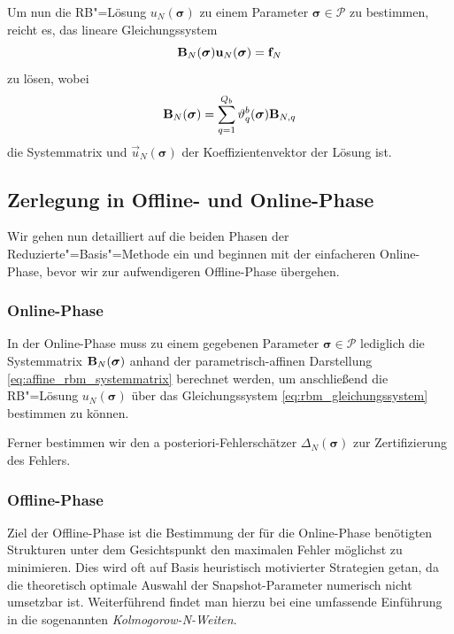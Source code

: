 \documentclass[../main.tex]{subfiles}
\begin{document}
Um nun die RB"=Lösung $u_{N}(\bm \sigma)$ zu einem Parameter $\bm \sigma \in \mathcal P$ zu bestimmen, reicht es, das lineare Gleichungssystem
\begin{equation}
\label{eq:rbm_gleichungssystem}
    \mathbf{B}_{N}(\bm \sigma) \mathbf{u}_{N}(\bm \sigma) = \mathbf{f}_{N}
\end{equation}
zu lösen, wobei
\begin{equation}
\label{eq:affine_rbm_systemmatrix}
    \mathbf{B}_{N}(\bm \sigma) = \sum_{q = 1}^{Q_b} \vartheta_{q}^{b}(\bm \sigma) \mathbf{B}_{N, q}
\end{equation}
die Systemmatrix und $\vec{u}_{N}(\bm \sigma)$ der Koeffizientenvektor der Lösung ist.

\subsection{Zerlegung in Offline- und Online-Phase} %
\label{sub:zerlegung_in_offline_und_online_phase}

Wir gehen nun detailliert auf die beiden Phasen der Reduzierte"=Basis"=Methode ein und beginnen mit der einfacheren Online-Phase, bevor wir zur aufwendigeren Offline-Phase übergehen.

\subsubsection{Online-Phase} %
\label{ssub:online_phase}

In der Online-Phase muss zu einem gegebenen Parameter $\bm \sigma \in \mathcal P$ lediglich die Systemmatrix $\mathbf{B}_{N}(\bm \sigma)$ anhand der parametrisch-affinen Darstellung \cref{eq:affine_rbm_systemmatrix} berechnet werden, um anschließend die RB"=Lösung $u_{N}(\bm \sigma)$ über das Gleichungssystem \cref{eq:rbm_gleichungssystem} bestimmen zu können.

Ferner bestimmen wir den a posteriori-Fehlerschätzer $\Delta_{N}(\bm \sigma)$ zur Zertifizierung des Fehlers.


\subsubsection{Offline-Phase} %
\label{ssub:offline_phase}

Ziel der Offline-Phase ist die Bestimmung der für die Online-Phase benötigten Strukturen unter dem Gesichtspunkt den maximalen Fehler möglichst zu minimieren.
Dies wird oft auf Basis heuristisch motivierter Strategien getan, da die theoretisch optimale Auswahl der Snapshot-Parameter numerisch nicht umsetzbar ist.
Weiterführend findet man hierzu bei \cite{??} eine umfassende Einführung in die sogenannten \emph{Kolmogorow-N-Weiten}.
\end{document}
